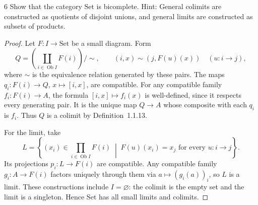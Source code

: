 \begin{exercise}{6}
Show that the category $\mathrm{Set}$ is bicomplete. Hint: General colimits
are constructed as quotients of disjoint unions, and general limits are
constructed as subsets of products.

\begin{proof}
Let $F\colon I\to\mathrm{Set}$ be a small diagram. Form
\[
 Q=\left(\coprod_{i\in\operatorname{Ob}I}F(i)\right)\big/\!\sim,
 \qquad (i,x)\sim(j,F(u)(x))\quad(u\colon i\to j),
\]
where $\sim$ is the equivalence relation generated by these pairs.
The maps $q_i\colon F(i)\to Q$, $x\mapsto[i,x]$, are compatible.
For any compatible family $f_i\colon F(i)\to A$, the formula
$[i,x]\mapsto f_i(x)$ is well-defined, since it respects every
generating pair. It is the unique map $Q\to A$ whose composite with
each $q_i$ is $f_i$. Thus $Q$ is a colimit by Definition~1.1.13.

For the limit, take
\[
 L=\left\{(x_i)\in\prod_{i\in\operatorname{Ob}I}F(i)
       \;\middle|\;F(u)(x_i)=x_j\text{ for every }u\colon i\to j\right\}.
\]
Its projections $p_i\colon L\to F(i)$ are compatible. Any compatible
family $g_i\colon A\to F(i)$ factors uniquely through them via
$a\mapsto(g_i(a))_i$, so $L$ is a limit.
These constructions include $I=\varnothing$: the colimit is the empty
set and the limit is a singleton. Hence $\mathrm{Set}$ has all small
limits and colimits.
\end{proof}
\end{exercise}
